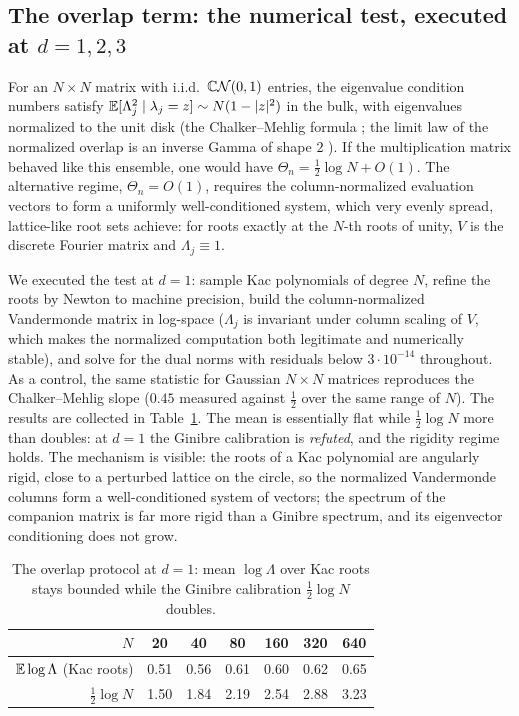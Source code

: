 \subsection{The overlap term: the numerical test, executed at $d=1,2,3$}\label{sec:protocol}

For an $N\times N$ matrix with i.i.d.\ $\mathbb{C}\mathcal{N}(0,1)$ entries, the eigenvalue condition numbers
satisfy $\mathbb{E}[\Lambda_j^2 \mid \lambda_j=z]\sim N(1-|z|^2)$ in the bulk, with eigenvalues
normalized to the unit disk (the Chalker--Mehlig formula \cite{chalker1998eigenvector}; the
limit law of the normalized overlap is an inverse Gamma of shape $2$
\cite{bourgade2020distribution}). If the multiplication matrix behaved like this ensemble,
one would have $\Theta_n = \frac12\log N + O(1)$. The alternative regime, $\Theta_n = O(1)$,
requires the column-normalized evaluation vectors to form a uniformly well-conditioned
system, which very evenly spread, lattice-like root sets achieve: for roots exactly at the
$N$-th roots of unity, $V$ is the discrete Fourier matrix and $\Lambda_j\equiv1$.

We executed the test at $d=1$: sample Kac polynomials of degree $N$, refine the roots by
Newton to machine precision, build the column-normalized Vandermonde matrix in log-space
($\Lambda_j$ is invariant under column scaling of $V$, which makes the normalized
computation both legitimate and numerically stable), and solve for the dual norms with
residuals below $3\cdot10^{-14}$ throughout. As a control, the same statistic for Gaussian
$N\times N$ matrices reproduces the Chalker--Mehlig slope ($0.45$ measured against
$\frac12$ over the same range of $N$). The results are collected in
Table~\ref{tab:overlap1}. The mean is essentially flat while $\frac12\log N$ more than
doubles: at $d=1$ the Ginibre calibration is \emph{refuted}, and the rigidity regime holds.
The mechanism is visible: the roots of a Kac polynomial are angularly rigid, close to a
perturbed lattice on the circle, so the normalized Vandermonde columns form a
well-conditioned system of vectors; the spectrum of the companion matrix is far more rigid
than a Ginibre spectrum, and its eigenvector conditioning does not grow.

\begin{table}[ht]
  \centering
  \begin{tabular}{r|cccccc}
    $N$ & 20 & 40 & 80 & 160 & 320 & 640 \\
    \hline
    $\mathbb{E}\log\Lambda$ (Kac roots) & 0.51 & 0.56 & 0.61 & 0.60 & 0.62 & 0.65 \\
    $\frac12\log N$ & 1.50 & 1.84 & 2.19 & 2.54 & 2.88 & 3.23
  \end{tabular}
  \caption{The overlap protocol at $d=1$: mean $\log\Lambda$ over Kac roots stays bounded
    while the Ginibre calibration $\frac12\log N$ doubles.}
  \label{tab:overlap1}
\end{table}

